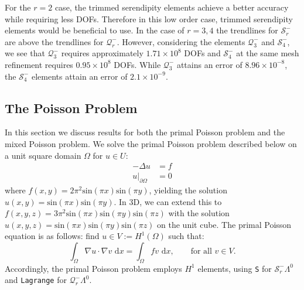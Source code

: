 \documentclass[format=acmsmall,screen,timestamp=false,a4paper]{acmart}
\newcommand\akg[1]{\textbf{\textcolor[rgb]{.5,0,1}{[Andrew: #1]}}}
\newcommand\josh[1]{\textbf{\textcolor[rgb]{0,.5,1}{[Josh: #1]}}}
\begin{document}
For the $r=2$ case, the trimmed serendipity elements achieve a better accuracy while requiring less DOFs.  Therefore in this low order case, trimmed serendipity elements would be beneficial to use.  In the case of $r=3,4$ the trendlines for $\mathcal{S}^-_r$ are above the trendlines for $\mathcal{Q}^-_r$.  However, considering the elements $\mathcal{Q}^-_3$ and $\mathcal{S}^-_4$, we see that $\mathcal{Q}^-_3$ requires approximately $1.71 \times 10^8$ DOFs and $\mathcal{S}^-_4$ at the same mesh refinement requires $0.95 \times 10^8$ DOFs.  While $\mathcal{Q}^-_3$ attains an error of $8.96 \times 10^{-8}$, the $\mathcal{S}^-_4$ elements attain an error of $2.1 \times 10^{-9}$.  


 



\subsection{The Poisson Problem}
In this section we discuss results for both the primal Poisson problem and the mixed Poisson problem.  We solve the primal Poisson problem described below on a unit square domain $\Omega$ for $u \in U$:
\begin{align*}
    -\Delta u &= f \\
    \displaystyle u\vert_{\partial \Omega} &= 0
\end{align*}
where $f(x,y) = 2\pi^2\text{sin}(\pi x)\text{sin}(\pi y) $, yielding the solution $u(x,y) = \text{sin}(\pi x)\text{sin}(\pi y)$. In 3D, we can extend this to $f(x,y,z) = 3\pi^2\text{sin}(\pi x)\text{sin}(\pi y)\text{sin}(\pi z)$ with the solution $u(x,y,z) = \text{sin}(\pi x)\text{sin}(\pi y)\text{sin}(\pi z)$ on the unit cube.  The primal Poisson equation is as follows: find $u \in V:= H^1(\Omega)$ such that:
\begin{equation*}
    \int_\Omega \nabla u \cdot \nabla v \text{ d}x = \int_\Omega f v \text{ d}x,\qquad \text{for all $v \in V$}.
\end{equation*}
Accordingly, the primal Poisson problem employs $H^1$ elements, using \texttt{S} for $\mathcal{S}^-_r \Lambda^0$ and \texttt{Lagrange} for $\mathcal{Q}^-_r \Lambda^0$. 
\end{document}
